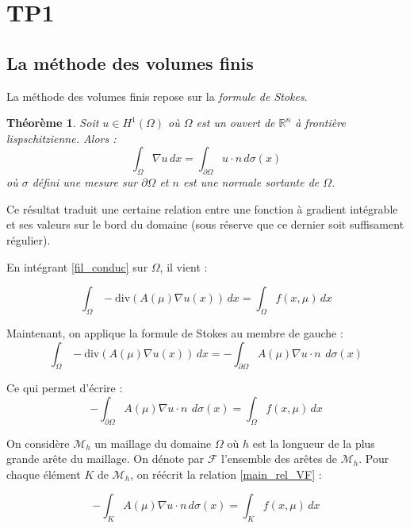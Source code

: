 \documentclass[12pt,a4paper,article]{memoir} %
\newtheorem{theoreme}{Théorème}[section]
\begin{document}
\newpage

\section{TP1}
\subsection{La méthode des volumes finis}
La méthode des volumes finis repose sur la \textit{formule de Stokes}.

\begin{theoreme}
    Soit $u \in H^1(\Omega)$ où $\Omega$ est un ouvert de $\mathbb{R}^n$ à frontière lispschitzienne. Alors : 
    \[
        \int_{\Omega}\nabla u \, dx = \int_{\partial\Omega} u \cdot n\, d\sigma(x)
    \]
    où $\sigma$ défini une mesure sur $\partial \Omega$ et $n$ est une normale sortante de $\Omega$. 
\end{theoreme}

Ce résultat traduit une certaine relation entre une fonction à gradient intégrable et ses valeurs sur le bord du domaine (sous réserve que ce dernier soit suffisament régulier).

\vspace{0.3cm}

En intégrant \eqref{fil_conduc} sur $\Omega$, il vient :

\[
    \int_{\Omega}-\text{div}(A(\mu)\nabla u(x)) \, dx = \int_{\Omega}f(x,\mu) \, dx
\]

Maintenant, on applique la formule de Stokes au membre de gauche :
\[
    \int_{\Omega}-\text{div}(A(\mu)\nabla u(x)) \, dx = -\int_{\partial\Omega}A(\mu)\nabla u \cdot n\ \, d\sigma(x) 
\]

Ce qui permet d'écrire : 
\begin{equation}
    \label{main_rel_VF}
    -\int_{\partial\Omega}A(\mu)\nabla u \cdot n\ \, d\sigma(x)  = \int_{\Omega}f(x,\mu) \, dx
\end{equation}

\vspace{0.3cm}

On considère $\mathcal{M}_h$ un maillage du domaine $\Omega$ où $h$ est la longueur de la plus grande arête du maillage. On dénote 
par $\mathcal{F}$ l'ensemble des arêtes de $\mathcal{M}_h$. Pour chaque élément $K$ de $\mathcal{M}_h$, on réécrit la relation \eqref{main_rel_VF} :

\[
    -\int_{K}A(\mu)\nabla u \cdot n \, d\sigma(x)  = \int_{K}f(x,\mu) \, dx
\]
\end{document}
